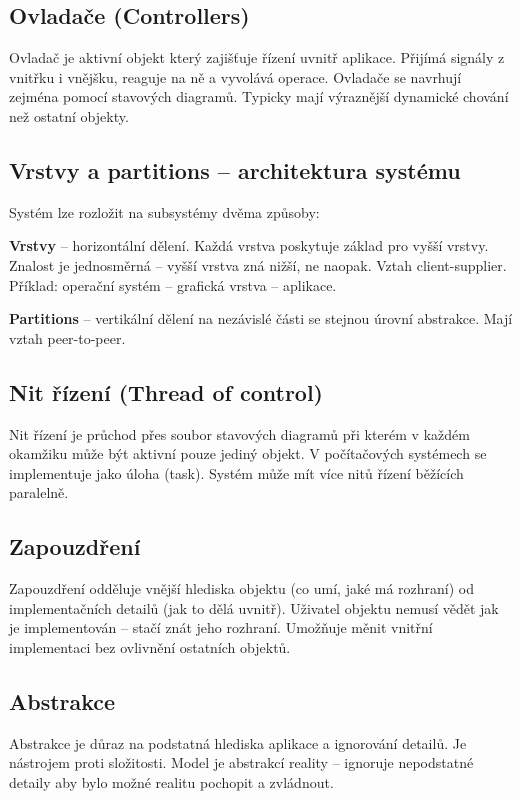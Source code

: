\documentclass[12pt, a4paper]{article}
\begin{document}
\subsection{Ovladače (Controllers)}

Ovladač je aktivní objekt který zajišťuje řízení uvnitř aplikace. Přijímá signály z vnitřku i vnějšku, reaguje na ně a vyvolává operace. Ovladače se navrhují zejména pomocí stavových diagramů. Typicky mají výraznější dynamické chování než ostatní objekty.

\subsection{Vrstvy a partitions -- architektura systému}

Systém lze rozložit na subsystémy dvěma způsoby:

\textbf{Vrstvy} -- horizontální dělení. Každá vrstva poskytuje základ pro vyšší vrstvy. Znalost je jednosměrná -- vyšší vrstva zná nižší, ne naopak. Vztah client-supplier. Příklad: operační systém -- grafická vrstva -- aplikace.

\textbf{Partitions} -- vertikální dělení na nezávislé části se stejnou úrovní abstrakce. Mají vztah peer-to-peer.

\subsection{Nit řízení (Thread of control)}

Nit řízení je průchod přes soubor stavových diagramů při kterém v každém okamžiku může být aktivní pouze jediný objekt. V počítačových systémech se implementuje jako úloha (task). Systém může mít více nitů řízení běžících paralelně.

\subsection{Zapouzdření}

Zapouzdření odděluje vnější hlediska objektu (co umí, jaké má rozhraní) od implementačních detailů (jak to dělá uvnitř). Uživatel objektu nemusí vědět jak je implementován -- stačí znát jeho rozhraní. Umožňuje měnit vnitřní implementaci bez ovlivnění ostatních objektů.

\subsection{Abstrakce}

Abstrakce je důraz na podstatná hlediska aplikace a ignorování detailů. Je nástrojem proti složitosti. Model je abstrakcí reality -- ignoruje nepodstatné detaily aby bylo možné realitu pochopit a zvládnout.
\end{document}
